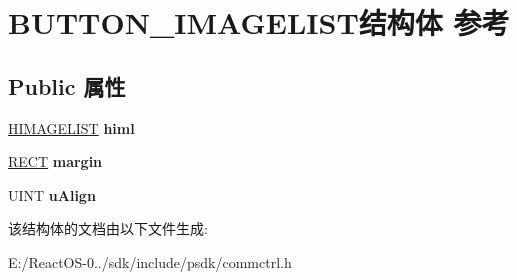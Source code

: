 \hypertarget{struct_b_u_t_t_o_n___i_m_a_g_e_l_i_s_t}{}\section{B\+U\+T\+T\+O\+N\+\_\+\+I\+M\+A\+G\+E\+L\+I\+S\+T结构体 参考}
\label{struct_b_u_t_t_o_n___i_m_a_g_e_l_i_s_t}
\subsection*{Public 属性}
\begin{DoxyCompactItemize}
\item 
\mbox{\label{struct_b_u_t_t_o_n___i_m_a_g_e_l_i_s_t_a91afbba7df4ba9594ea3369e3ee42f8f}} 
\hyperlink{struct___i_m_a_g_e_l_i_s_t}{H\+I\+M\+A\+G\+E\+L\+I\+ST} {\bfseries himl}
\item 
\mbox{\label{struct_b_u_t_t_o_n___i_m_a_g_e_l_i_s_t_a03687229d40f5897c4766cb0dda22116}} 
\hyperlink{structtag_r_e_c_t}{R\+E\+CT} {\bfseries margin}
\item 
\mbox{\label{struct_b_u_t_t_o_n___i_m_a_g_e_l_i_s_t_ae31f05e37fc9198521c971f740aed5b3}} 
U\+I\+NT {\bfseries u\+Align}
\end{DoxyCompactItemize}


该结构体的文档由以下文件生成\+:\begin{DoxyCompactItemize}
\item 
E\+:/\+React\+O\+S-\/0../sdk/include/psdk/commctrl.\+h\end{DoxyCompactItemize}
